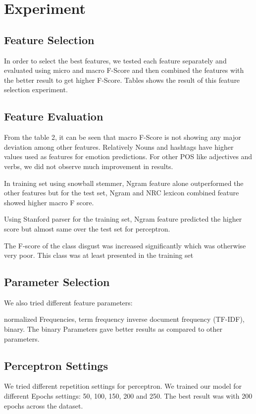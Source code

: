 \documentclass[11pt]{article}
\begin{document}
{  
  \section{Experiment}
  
  \subsection{Feature Selection}
  
  In order to select the best features, we tested each feature separately and evaluated using micro and macro F-Score and then combined the features with the better result to get higher F-Score. Tables shows the result of this feature selection experiment.
  
  \subsection{Feature Evaluation}
  
  From the table 2, it can be seen that macro F-Score is not showing any major deviation among other features. Relatively Nouns and hashtags have higher values used as features for emotion predictions.
  For other POS like adjectives and verbs, we did not observe much improvement in results.
  
  In training set using snowball stemmer, Ngram feature alone outperformed the other features but for the test set, Ngram and NRC lexicon combined feature showed higher macro F score.
  
  Using Stanford parser for the training set, Ngram feature predicted the higher score but almost same over the test set for perceptron. 
  
  
  
  The F-score of the class disgust was increased significantly which was otherwise very poor. This class was at least presented in the training set
  
  \subsection{Parameter Selection}
  
  
  We also tried different feature parameters:
  
  
  normalized Frequencies, term frequency inverse document frequency (TF-IDF), binary. The binary Parameters gave better results as compared to other
  parameters.
  
  
  \subsection{Perceptron Settings}
  We tried different repetition settings for perceptron. We trained our model for different Epochs settings:
  50, 100, 150, 200 and 250. The best result was with 200 epochs across the dataset.
  
}
\end{document}
